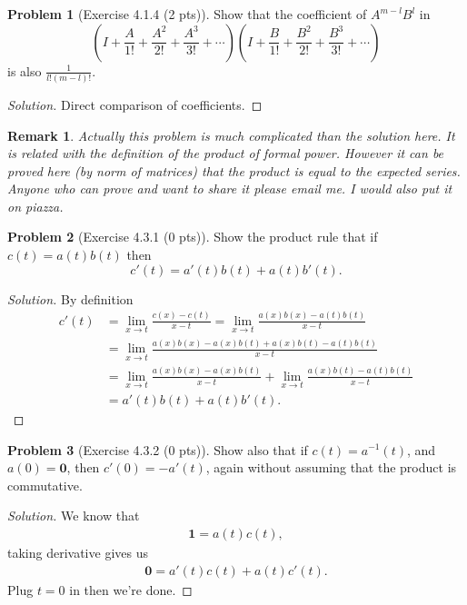 \documentclass{article}
\theoremstyle{definition}
\newtheorem{problem}{Problem}
\theoremstyle{plain}
\newtheorem*{remark}{Remark}
\begin{document}
\begin{problem}[Exercise 4.1.4 (2 pts)]Show that the coefficient of $A^{m-l}B^l$ in
\begin{displaymath}
\left(I+\frac{A}{1!}+\frac{A^2}{2!}+\frac{A^3}{3!}+\cdots\right)\left(I+\frac{B}{1!}+\frac{B^2}{2!}+\frac{B^3}{3!}+\cdots\right)
\end{displaymath}
is also $\frac{1}{l!(m-l)!}$.
\end{problem}
\begin{adjustwidth}{0.7cm}{}
\color{blue}
\begin{proof}[Solution]
Direct comparison of coefficients.
\color{black}
\end{proof}
\end{adjustwidth}
\begin{remark}
Actually this problem is much complicated than the solution here. It is related with the definition of the product of formal power. However it can be proved here (by norm of matrices) that the product is equal to the expected series. Anyone who can prove and want to share it please email me. I would also put it on piazza.
\end{remark}

\begin{problem}[Exercise 4.3.1 (0 pts)]Show the product rule that if $c(t)=a(t)b(t)$ then
\begin{displaymath}
c'(t)=a'(t)b(t)+a(t)b'(t).
\end{displaymath}
\end{problem}
\begin{adjustwidth}{0.7cm}{}
\color{blue}
\begin{proof}[Solution]
By definition
\begin{align*}
c'(t)&=\lim_{x\to t}\frac{c(x)-c(t)}{x-t}=\lim_{x\to t}\frac{a(x)b(x)-a(t)b(t)}{x-t}\\
&=\lim_{x\to t}\frac{a(x)b(x)-a(x)b(t)+a(x)b(t)-a(t)b(t)}{x-t}\\
&=\lim_{x\to t}\frac{a(x)b(x)-a(x)b(t)}{x-t}+\lim_{x\to t}\frac{a(x)b(t)-a(t)b(t)}{x-t}\\
&=a'(t)b(t)+a(t)b'(t).
\end{align*}
\color{black}
\end{proof}
\end{adjustwidth}

\begin{problem}[Exercise 4.3.2 (0 pts)]Show also that if $c(t)=a^{-1}(t)$, and $a(0)=\bm{0}$, then $c'(0)=-a'(t)$, again without assuming that the product is commutative.
\end{problem}
\begin{adjustwidth}{0.7cm}{}
\color{blue}
\begin{proof}[Solution]
We know that
\begin{align*}
\bm{1}=a(t)c(t),
\end{align*}
taking derivative gives us
\begin{align*}
\bm{0}=a'(t)c(t)+a(t)c'(t).
\end{align*}
Plug $t=0$ in then we're done.
\color{black}
\end{proof}
\end{adjustwidth}
\end{document}
